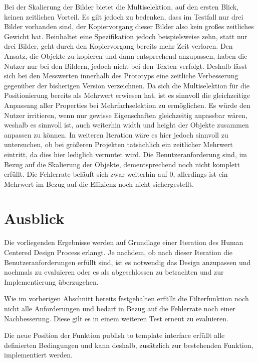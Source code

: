 Bei der Skalierung der Bilder bietet die Multiselektion, auf den ersten Blick, keinen zeitlichen Vorteil.
Es gilt jedoch zu bedenken, dass im Testfall nur drei Bilder vorhanden sind, der Kopiervorgang dieser Bilder also kein großes zeitliches Gewicht hat.
Beinhaltet eine Spezifikation jedoch beispielsweise zehn, statt nur drei Bilder, geht durch den Kopiervorgang bereits mehr Zeit verloren.
Den Ansatz, die Objekte zu kopieren und dann entsprechend anzupassen, haben die Nutzer nur bei den Bildern, jedoch nicht bei den Texten verfolgt.
Deshalb lässt sich bei den Messwerten innerhalb des Prototyps eine zeitliche Verbesserung gegenüber der bisherigen Version verzeichnen.
Da sich die Multiselektion für die Positionierung bereits als Mehrwert erwiesen hat, ist es sinnvoll die gleichzeitige Anpassung aller Properties bei Mehrfachselektion zu ermöglichen.
Es würde den Nutzer irritieren, wenn nur gewisse Eigenschaften gleichzeitig anpassbar wären, weshalb es sinnvoll ist, auch weiterhin width und height der Objekte zusammen anpassen zu können.
In weiteren Iteration wäre es hier jedoch sinnvoll zu untersuchen, ob bei größeren Projekten tatsächlich ein zeitlicher Mehrwert eintritt, da dies hier lediglich vermutet wird.
Die Benutzeranforderung sind, im Bezug auf die Skalierung der Objekte, dementsprechend noch nicht komplett erfüllt.
Die Fehlerrate beläuft sich zwar weiterhin auf 0, allerdings ist ein Mehrwert im Bezug auf die Effizienz noch nicht sichergestellt.

\section {Ausblick}
Die vorliegenden Ergebnisse werden auf Grundlage einer Iteration des Human Centered Design Process erlangt.
Je nachdem, ob nach dieser Iteration die Benutzeranforderungen erfüllt sind, ist es notwendig das Design anzupassen und nochmals zu evaluieren oder es als abgeschlossen zu betrachten und zur Implementierung überzugehen.

Wie im vorherigen Abschnitt bereits festgehalten erfüllt die Filterfunktion noch nicht alle Anforderungen und bedarf in Bezug auf die Fehlerrate noch einer Nachbesserung.
Diese gilt es in einem weiteren Test erneut zu evaluieren.

Die neue Position der Funktion \glqq publish to template interface\grqq{} erfüllt alle definierten Bedingungen und kann deshalb, zusätzlich zur bestehenden Funktion, implementiert werden.

